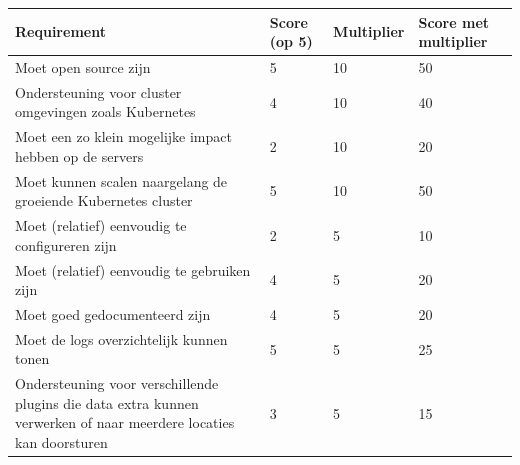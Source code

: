 \begin{table}[ht]
    \begin{tabular}{| m{20em} | m{2cm} | m{2cm} | m{2cm} |}
        \hline
        \textbf{Requirement}                                                                                              & \textbf{Score (op 5)} & \textbf{Multiplier} & \textbf{Score met multiplier} \\ \hline
        Moet open source zijn                                                                                             & 5                     & 10                  & 50                            \\ \hline
        Ondersteuning voor cluster omgevingen zoals Kubernetes                                                            & 4                     & 10                  & 40                            \\ \hline
        Moet een zo klein mogelijke impact hebben op de servers                                                           & 2                     & 10                  & 20                            \\ \hline
        Moet kunnen scalen naargelang de groeiende Kubernetes cluster                                                     & 5                     & 10                  & 50                            \\ \hline
        Moet (relatief) eenvoudig te configureren zijn                                                                    & 2                     & 5                   & 10                            \\ \hline
        Moet (relatief) eenvoudig te gebruiken zijn                                                                       & 4                     & 5                   & 20                            \\ \hline
        Moet goed gedocumenteerd zijn                                                                                     & 4                     & 5                   & 20                            \\ \hline
        Moet de logs overzichtelijk kunnen tonen                                                                          & 5                     & 5                   & 25                            \\ \hline
        Ondersteuning voor verschillende plugins die data extra kunnen verwerken of naar meerdere locaties kan doorsturen & 3                     & 5                   & 15                            \\ \hline

\end{tabular}
\end{table}
